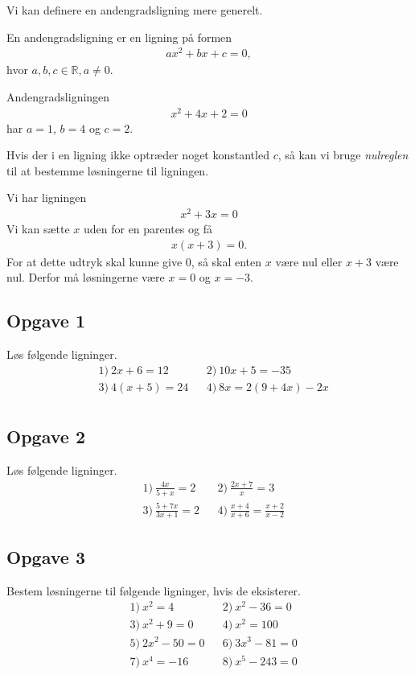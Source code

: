 Vi kan definere en andengradsligning mere generelt.
\begin{defn}[Andengradsligning]
	En andengradsligning er en ligning på formen
	\begin{align*}
		ax^2 + bx + c = 0,
	\end{align*}
	hvor $a,b,c \in \mathbb{R}, a \neq 0$. 
\end{defn}
\begin{exa}
	Andengradsligningen 
	\begin{align*}
		x^2 + 4x + 2 = 0
	\end{align*}
	har $a = 1$, $b = 4$ og $c = 2$.
\end{exa}


Hvis der i en ligning ikke optræder noget konstantled $c$, så kan vi bruge \textit{nulreglen} til at bestemme løsningerne til ligningen. 
\begin{exa}
	Vi har ligningen 
	\begin{align*}
		x^2 + 3x = 0
	\end{align*}
	Vi kan sætte $x$ uden for en parentes og få
	\begin{align*}
		x(x + 3) = 0.
	\end{align*}
	For at dette udtryk skal kunne give 0, så skal enten $x$ være nul eller $x + 3$ være nul. Derfor må 
	løsningerne være $x = 0$ og $x = -3$.
\end{exa}

\subsection*{Opgave 1}
Løs følgende ligninger.
\begin{align*}
	&1) \ 2x + 6 = 12 & &2) \ 10x + 5 = -35 \\
	&3) \ 4(x + 5) = 24 & &4) \ 8x = 2(9+4x)-2x \\
\end{align*}
\subsection*{Opgave 2}
Løs følgende ligninger.
\begin{align*}
	&1) \ \frac{4x}{5+x} = 2 & &2) \ \frac{2x + 7}{x} = 3 \\
	&3) \ \frac{5 + 7x}{3x + 1} = 2 & &4) \ \frac{x+4}{x+6} = \frac{x+2}{x-2}	
\end{align*}
\subsection*{Opgave 3}
Bestem løsningerne til følgende ligninger, hvis de eksisterer. 
\begin{align*}
	&1) \ x^2 = 4 & &2) \ x^2-36 = 0\\
	&3) \ x^2 + 9 = 0  & &4) \ x^2 = 100 \\
	&5) \ 2x^2 - 50 = 0 & &6) \ 3x^3 - 81 = 0\\
	&7) \ x^4 = -16 & &8) \ x^5 - 243 = 0\\
\end{align*}
